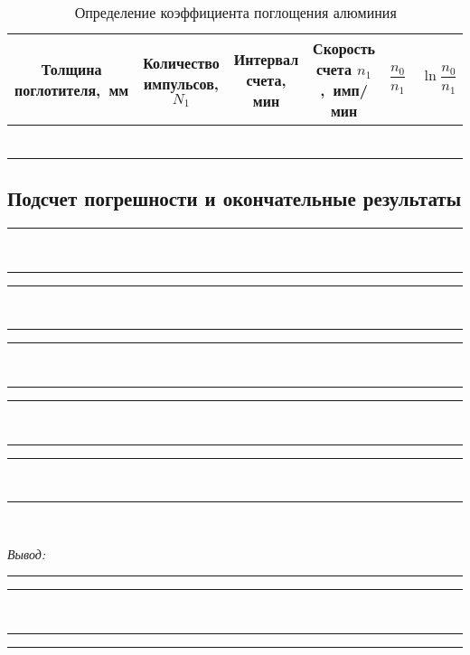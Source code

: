\documentclass[10pt, pscyr, nonums]{hedlabwork}
\begin{document}
  \begin{table}[h!]
    \center
    \caption{Определение коэффициента поглощения алюминия}
    \begin{tabular}{|*{6}{C{.13}|}} \hline
      Толщина поглотителя,~мм &
        Количество импульсов, \( N_1 \) &
        Интервал счета, мин &
        Скорость счета \( n_1 \),~имп/мин &
        \( \dfrac{n_0}{n_1} \) &
        \( \ln\dfrac{n_0}{n_1} \) \\ \hline
      &&&&& \\ \hline
      &&&&& \\ \hline
      &&&&& \\ \hline
      &&&&& \\ \hline
      &&&&& \\ \hline
      &&&&& \\ \hline
    \end{tabular}
  \end{table}
  \pagebreak

  \subsection{Подсчет погрешности и окончательные результаты}
  \center
  \rule{.95\textwidth}{.5pt} \\ \rule{.95\textwidth}{.5pt}
  \rule{.95\textwidth}{.5pt} \\ \rule{.95\textwidth}{.5pt}
  \rule{.95\textwidth}{.5pt} \\ \rule{.95\textwidth}{.5pt}
  \rule{.95\textwidth}{.5pt} \\ \rule{.95\textwidth}{.5pt}
  \rule{.95\textwidth}{.5pt} \\ \rule{.95\textwidth}{.5pt} \\
  \vspace*{2em}

  \emph{Вывод:} \rule{.885\textwidth}{.5pt}
  \rule{.95\textwidth}{.5pt} \\ \rule{.95\textwidth}{.5pt}
  \rule{.95\textwidth}{.5pt}
\end{document}
